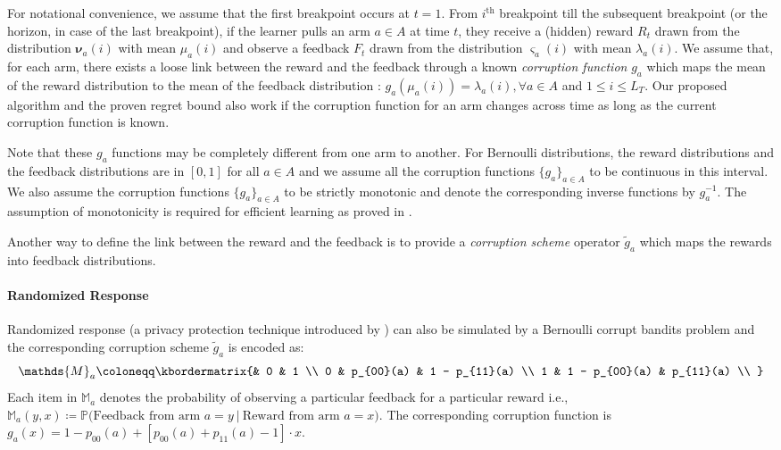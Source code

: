 \documentclass[letterpaper]{article} %
\newcommand{\defined}{\coloneqq}
\newcommand{\IsEqual}{=}
\newcommand\given[1][]{\:#1\vert\:}
\newcommand{\MeanReAtIChanges}[2]{\mu_#1(#2)}
\newcommand{\MeanFeAtIChanges}[2]{\lambda_#1(#2)}
\newcommand{\numChanges}{L}
\newcommand{\RewardDist}[2]{\boldsymbol{\nu}_{#1}(#2)}
\newcommand{\FeedbackDist}[2]{\boldsymbol{\varsigma}_{#1}(#2)}
\begin{document}
For notational convenience, we assume that the first breakpoint occurs at $t=1$. From $i^{\text{th}}$ breakpoint till the subsequent breakpoint (or the horizon, in case of the last breakpoint), if the learner pulls an arm $ a\in A$ at time $t$, they receive a (hidden) reward $R_t$ drawn from the distribution $\RewardDist{a}{i}$ with mean $\MeanReAtIChanges{a}{i}$ and observe a feedback $F_t$ drawn from the distribution $\FeedbackDist{a}{i}$ with mean $\MeanFeAtIChanges{a}{i}$.
We assume that, for each arm, there exists a loose link between the reward and the feedback through a known \textit{corruption function} $g_a$ which maps the mean of the reward distribution to the mean of the feedback distribution :
$ g_a( \MeanReAtIChanges{a}{i} )= \MeanFeAtIChanges{a}{i}, \forall a\in A$ and $1\leq i \leq \numChanges_T$. Our proposed algorithm and the proven regret bound also work if the corruption function for an arm changes across time as long as the current corruption function is known. %

Note that these $g_a$ functions may be completely different from one arm to another.
For Bernoulli distributions, the reward distributions and the feedback distributions are in $[0,1]$ for all $a \in A$ and we assume all the corruption functions $\{g_a\}_{a \in A}$ to be continuous
in this interval. We also assume the corruption functions $\{g_a\}_{a \in A}$ to be strictly monotonic and denote the corresponding inverse functions by $g_a^{-1}$. The assumption of monotonicity is required for efficient learning as proved in \citet{pmlr-v83-gajane18a}.

Another way to define the link between the reward and the feedback is to provide a \textit{corruption scheme} operator $\tilde{g}_a$ which maps the rewards into feedback distributions.

\paragraph{Randomized Response}
Randomized response (a privacy protection technique introduced by \cite{Warner1965}) can also be simulated by a Bernoulli corrupt bandits problem and the corresponding corruption scheme $\tilde{g}_a$ is encoded as:
\begin{equation}
\label{eq:CorruptionMatrix}
\mathds{M}_{a} \defined \kbordermatrix{%
& 0  & 1  \\
0 & p_{00}(a) & 1 - p_{11}(a) \\
1 & 1 - p_{00}(a) & p_{11}(a) \\
}
\end{equation}
Each item in $\mathds{M}_{a}$ denotes the probability of observing a particular feedback
for a particular reward i.e.,
$
\mathds{M}_a(y,x) \defined \mathds{P} \big( \text{Feedback from arm } a \IsEqual  y
\given
\text{Reward from arm } a \IsEqual x \big).
$
The corresponding corruption function is $g_a(x) =  1 - p_{00}(a) + [p_{00}(a) + p_{11}(a) - 1]\cdot{} x.$
\end{document}
